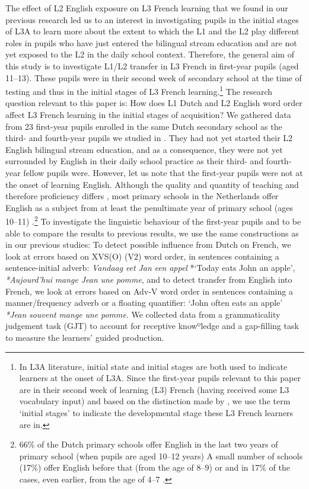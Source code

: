 \documentclass[output=paper,modfonts,nonflat, newtxmath]{langsci/langscibook}
\begin{document}
  The effect of L2 English exposure on L3 French learning that we found in our previous research led us to an interest in investigating pupils in the initial stages of L3A to learn more about the extent to which the L1 and the L2 play different roles in pupils who have just entered the bilingual stream education and are not yet exposed to the L2 in the daily school context. Therefore, the general aim of this study is to investigate L1/L2 transfer in L3 French in first-year pupils (aged 11–13). These pupils were in their second week of secondary school at the time of testing and thus in the initial stages of L3 French learning.\footnote{ \textrm{In L3A literature, initial state and initial stages are both used to indicate learners at the onset of L3A. Since the first-year pupils relevant to this paper are in their second week of learning (L3) French (having received some L3 vocabulary input) and based on the distinction made by \citet{GarciaMayoRothman2012}, we use the term ‘initial stages’ to indicate the developmental stage these L3 French learners are in.}} The research question relevant to this paper is: How does L1 Dutch and L2 English word order affect L3 French learning in the initial stages of acquisition? We gathered data from 23 first-year pupils enrolled in the same Dutch secondary school as the third- and fourth-year pupils we studied in \citet{StadtEtAl2016, StadtEtAl2018Exposure}. They had not yet started their L2 English bilingual stream education, and as a consequence, they were not yet surrounded by English in their daily school practice as their third- and fourth-year fellow pupils were. However, let us note that the first-year pupils were not at the onset of learning English. Although the quality and quantity of teaching and therefore proficiency differs \citep{UnsworthEtAl2015}, most primary schools in the Netherlands offer English as a subject from at least the penultimate year of primary school (ages 10–11) \citep{Rose2016}.\footnote{66\% of the Dutch primary schools offer English in the last two years of primary school (when pupils are aged 10–12 years) A small number of schools (17\%) offer English before that (from the age of 8–9) or and in 17\% of the cases, even earlier, from the age of 4–7 \citep{ThijsEtAl2011}.} To investigate the linguistic behaviour of the first-year pupils and to be able to compare the results to previous results, we use the same constructions as in our previous studies: To detect possible influence from Dutch on French, we look at errors based on XVS(O) (V2) word order, in sentences containing a sentence-initial adverb: \textit{Vandaag} {\textit{eet}} \textit{Jan} \textit{een} \textit{appel} *‘Today {eats} John an apple’, \textit{*Aujourd’hui} {\textit{mange}} \textit{Jean} \textit{une} \textit{pomme}, and to detect transfer from English into French, we look at errors based on Adv-V word order in sentences containing a manner/frequency adverb or a floating quantifier: ‘John often {eats} an apple’ \textit{*Jean} \textit{souvent} {\textit{mange}} \textit{une} \textit{pomme}. We collected data from a grammaticality judgement task (GJT) to account for receptive knowºledge and a gap-filling task to measure the learners’ guided production.
\end{document}
